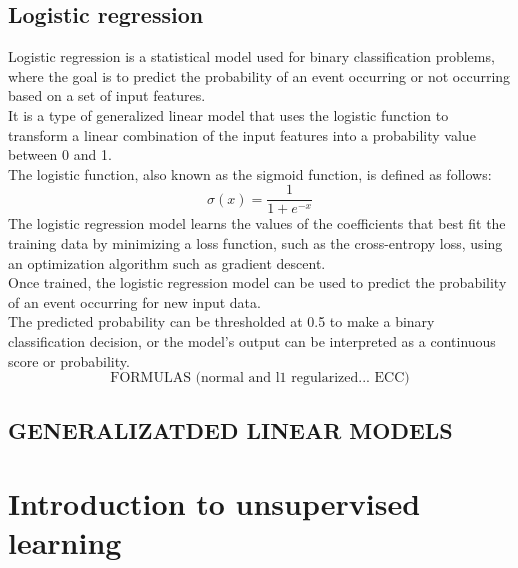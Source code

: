 \documentclass{article}
\begin{document}
\subsection{Logistic regression}
Logistic regression is a statistical model used for binary classification problems, where the goal is to predict the probability of an event occurring or not occurring based on a set of input features.\\
It is a type of generalized linear model that uses the logistic function to transform a linear combination of the input features into a probability value between 0 and 1.\\
The logistic function, also known as the sigmoid function, is defined as follows:\\
\[\sigma(x) = \frac{1}{1 + e^{-x}}\]
The logistic regression model learns the values of the coefficients that best fit the training data by minimizing a loss function, such as the cross-entropy loss, using an optimization algorithm such as gradient descent.\\
Once trained, the logistic regression model can be used to predict the probability of an event occurring for new input data.\\
The predicted probability can be thresholded at 0.5 to make a binary classification decision, or the model's output can be interpreted as a continuous score or probability.
\[\text{FORMULAS (normal and l1 regularized... ECC)}\]
\subsection{GENERALIZATDED LINEAR MODELS}
\section{Introduction to unsupervised learning}
\end{document}
